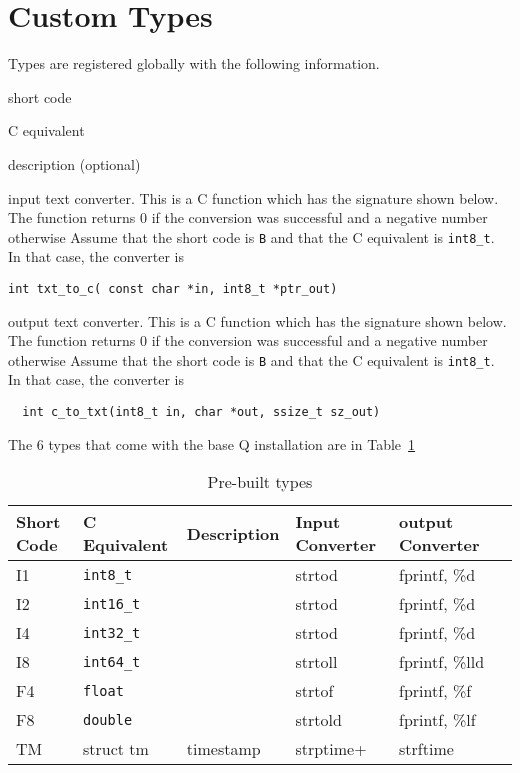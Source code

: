 \documentclass[letterpaper]{article}
\begin{document}
\section{Custom Types}
\label{custom_types}

Types are registered globally with the following information. 
\be
\item short code 
\item C equivalent
\item description (optional)
\item input text converter. This is a C function which has the
  signature shown below. 
The function returns 0 if the conversion was successful and a
  negative number otherwise
  Assume that the short code
  is {\tt B} and that the C equivalent is \verb+int8_t+. In that case, the
  converter is 
  \begin{verbatim}
int txt_to_c( const char *in, int8_t *ptr_out)
\end{verbatim}
\item output text converter. This is a C function which has the
  signature shown below. 
The function returns 0 if the conversion was successful and a
  negative number otherwise
  Assume that the short code
  is {\tt B} and that the C equivalent is \verb+int8_t+. In that case, the
  converter is 
  \begin{verbatim}
  int c_to_txt(int8_t in, char *out, ssize_t sz_out)
\end{verbatim}
  \ee

The 6 types that come with the base Q installation are in
Table~\ref{tbl_default_types}

\begin{table}[hb]
\centering
\begin{tabular}{|l|l|l|l|l|l|} \hline \hline
  {\bf Short Code} & {\bf C Equivalent} & {\bf Description} %
  & {\bf Input Converter} & {\bf output Converter} \\ \hline \hline
  I1 & \verb+int8_t+ &  & strtod & fprintf, \%d\\ \hline
  I2 & \verb+int16_t+ & & strtod & fprintf, \%d\\ \hline
  I4 & \verb+int32_t+ & & strtod & fprintf, \%d\\ \hline
  I8 & \verb+int64_t+ & & strtoll & fprintf, \%lld \\ \hline
  F4 & \verb+float+ &   & strtof & fprintf, \%f\\ \hline
  F8 & \verb+double+ &  & strtold & fprintf, \%lf\\ \hline
  TM & struct tm & timestamp & strptime+ & strftime \\ \hline
\hline
\end{tabular}
\caption{Pre-built types}
\label{tbl_default_types}
\end{table}
\end{document}
